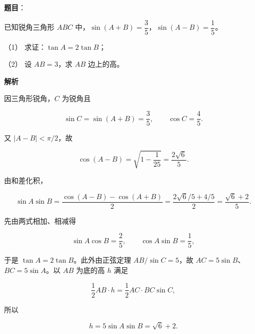 \begin{answer}

\textbf{题目}：

已知锐角三角形 $ABC$ 中，$\sin(A+B)=\dfrac35$，$\sin(A-B)=\dfrac15$。

（1） 求证：$\tan A=2\tan B$；

（2） 设 $AB=3$，求 $AB$ 边上的高。

\textbf{解析}


因三角形锐角，$C$ 为锐角且

\nopagebreak[4]
\[
\sin C=\sin(A+B)=\frac35,\qquad \cos C=\frac45.
\]

又 $|A-B|<\pi/2$，故

\nopagebreak[4]
\[
\cos(A-B)=\sqrt{1-\frac1{25}}=\frac{2\sqrt6}{5}.
\]

由和差化积，

\nopagebreak[4]
\[
\sin A\sin B
=\frac{\cos(A-B)-\cos(A+B)}2
=\frac{2\sqrt6/5+4/5}{2}
=\frac{\sqrt6+2}{5}.
\]

先由两式相加、相减得

\nopagebreak[4]
\[
\sin A\cos B=\frac25,\qquad \cos A\sin B=\frac15,
\]

于是 $\tan A=2\tan B$。此外由正弦定理 $AB/\sin C=5$，故 $AC=5\sin B$、$BC=5\sin A$。以 $AB$ 为底的高 $h$ 满足

\nopagebreak[4]
\[
\frac12AB\cdot h=\frac12AC\cdot BC\sin C,
\]


所以

\nopagebreak[4]
\[
h=5\sin A\sin B=\sqrt6+2.
\]



\end{answer}
